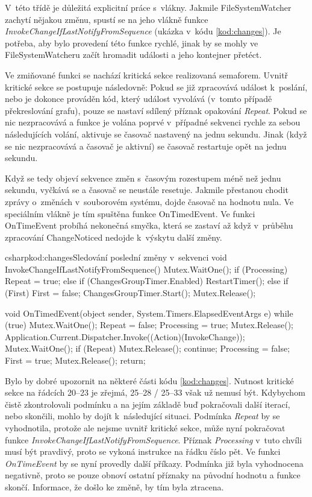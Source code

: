 \documentclass[
  biblatex,
  glossaries,
  index
]{kidiplom}
\begin{document}
V~této třídě je důležitá explicitní práce s~vlákny. Jakmile FileSystemWatcher zachytí nějakou změnu, spustí se na jeho vlákně funkce {\it InvokeChangeIfLastNotifyFromSequence} (ukázka v~kódu \ref{kod:changes}). Je potřeba, aby bylo provedení této funkce rychlé, jinak by se mohly ve FileSystemWatcheru začít hromadit události a jeho kontejner přetéct.

Ve zmiňované funkci se nachází kritická sekce realizovaná semaforem. Uvnitř kritické sekce se postupuje následovně: Pokud se již zpracovává  událost k~poslání, nebo je dokonce prováděn kód, který událost vyvolává (v~tomto případě překreslování grafu), pouze se nastaví sdílený příznak opakování {\it Repeat}. Pokud se nic nezpracovává a funkce je volána poprvé v~případné sekvenci rychle za sebou následujících volání, aktivuje se časovač nastavený na jednu sekundu. Jinak (když se nic nezpracovává a časovač je aktivní) se časovač restartuje opět na jednu sekundu.

Když se tedy objeví sekvence změn s~časovým rozestupem méně než jednu sekundu, vyčkává se a časovač se neustále resetuje. Jakmile přestanou chodit zprávy o~změnách v~souborovém systému, dojde časovač na hodnotu nula. Ve speciálním vlákně je tím spuštěna funkce OnTimedEvent.
Ve funkci OnTimeEvent probíhá nekonečná smyčka, která se zastaví až když v~průběhu zpracování ChangeNoticed nedojde k~výskytu další změny.

\begin{kicode}{csharp}{kod:changes}{Sledování poslední změny v~sekvenci}
void InvokeChangeIfLastNotifyFromSequence()
{
    Mutex.WaitOne();
    if (Processing)
        Repeat = true;
    else if (ChangesGroupTimer.Enabled)
        RestartTimer();
    else if (First)
    {
        First = false;
        ChangesGroupTimer.Start();
    }
    Mutex.Release();
}

void OnTimedEvent(object sender, System.Timers.ElapsedEventArgs e)
{
    while (true)
    {
        Mutex.WaitOne();
        Repeat = false;
        Processing = true;
        Mutex.Release();
        Application.Current.Dispatcher.Invoke((Action)(InvokeChange));
        Mutex.WaitOne();
        if (Repeat)
        {
            Mutex.Release();
            continue;
        }
        Processing = false;
        First = true;
        Mutex.Release();
        return;
    }
}
\end{kicode}

Bylo by dobré upozornit na některé části kódu \ref{kod:changes}. Nutnost kritické sekce na řádcích 20--23 je zřejmá, 25--28 / 25--33 však už nemusí být. Kdybychom čistě zkontrolovali podmínku a na jejím základě buď pokračovali další iterací, nebo skončili, mohlo by dojít k~následující situaci. Podmínka {\it Repeat} by se vyhodnotila, protože ale nejsme uvnitř kritické sekce, může nyní pokračovat funkce {\it InvokeChangeIfLastNotifyFromSequence}. Příznak {\it Processing} v~tuto chvíli musí být pravdivý, proto se vykoná instrukce na řádku číslo pět. Ve funkci {\it OnTimeEvent} by se nyní provedly další příkazy. Podmínka již byla vyhodnocena negativně, proto se pouze obnoví ostatní příznaky na původní hodnotu a funkce skončí. Informace, že došlo ke změně, by tím byla ztracena.
\end{document}

